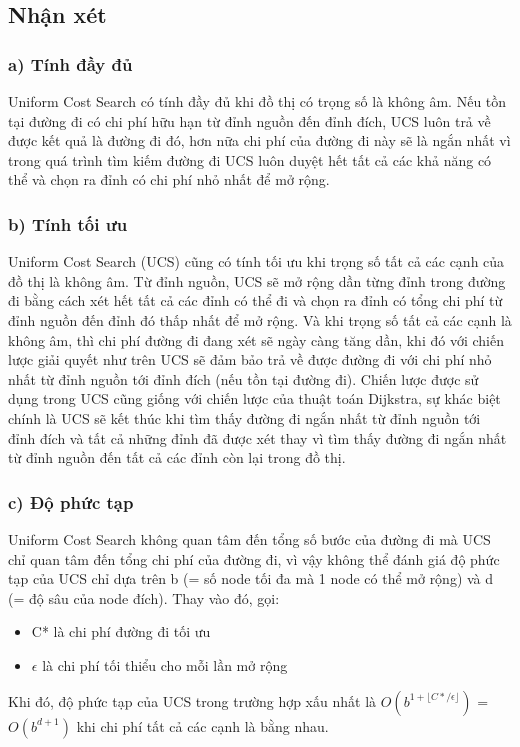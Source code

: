 \subsection{Nhận xét}
\subsubsection{a) Tính đầy đủ}
Uniform Cost Search có tính đầy đủ khi đồ thị có trọng số là không âm.  Nếu tồn tại đường đi có chi phí hữu hạn từ đỉnh nguồn đến đỉnh đích, UCS luôn trả về được kết quả là đường đi đó, hơn nữa chi phí của đường đi này sẽ là ngắn nhất vì trong quá trình tìm kiếm đường đi UCS luôn duyệt hết tất cả các khả năng có thể và chọn ra đỉnh có chi phí nhỏ nhất để mở rộng. 
\subsubsection{b) Tính tối ưu}
Uniform Cost Search (UCS) cũng có tính tối ưu khi trọng số tất cả các cạnh của đồ thị là không âm. Từ đỉnh nguồn, UCS sẽ mở rộng dần từng đỉnh trong đường đi bằng cách xét hết tất cả các đỉnh có thể đi và chọn ra đỉnh có tổng chi phí từ đỉnh nguồn đến đỉnh đó thấp nhất để mở rộng. Và khi trọng số tất cả các cạnh là không âm, thì chi phí đường đi đang xét sẽ ngày càng tăng dần, khi đó với chiến lược giải quyết như trên UCS sẽ đảm bảo trả về được đường đi với chi phí nhỏ nhất từ đỉnh nguồn tới đỉnh đích (nếu tồn tại đường đi). Chiến lược được sử dụng trong UCS cũng giống với chiến lược của thuật toán Dijkstra, sự khác biệt chính là UCS sẽ kết thúc khi tìm thấy đường đi ngắn nhất từ đỉnh nguồn tới đỉnh đích và tất cả những đỉnh đã được xét thay vì tìm thấy đường đi ngắn nhất từ đỉnh nguồn đến tất cả các đỉnh còn lại trong đồ thị.
\subsubsection{c) Độ phức tạp}
\hspace{0.42cm}Uniform Cost Search không quan tâm đến tổng số bước của đường đi mà UCS chỉ quan tâm đến tổng chi phí của đường đi, vì vậy không thể đánh giá độ phức tạp của UCS chỉ dựa trên b (= số node tối đa mà 1 node có thể mở rộng) và d (= độ sâu của node đích). Thay vào đó, gọi: 
\begin{itemize}
    \item C* là chi phí đường đi tối ưu
    \item $\epsilon$ là chi phí tối thiểu cho mỗi lần mở rộng 
\end{itemize}
\hspace{0.42cm} Khi đó, độ phức tạp của UCS trong trường hợp xấu nhất là $O(b^{1 + \lfloor C*/\epsilon \rfloor})$ = $O(b^{d+1})$ khi chi phí tất cả các cạnh là bằng nhau.

